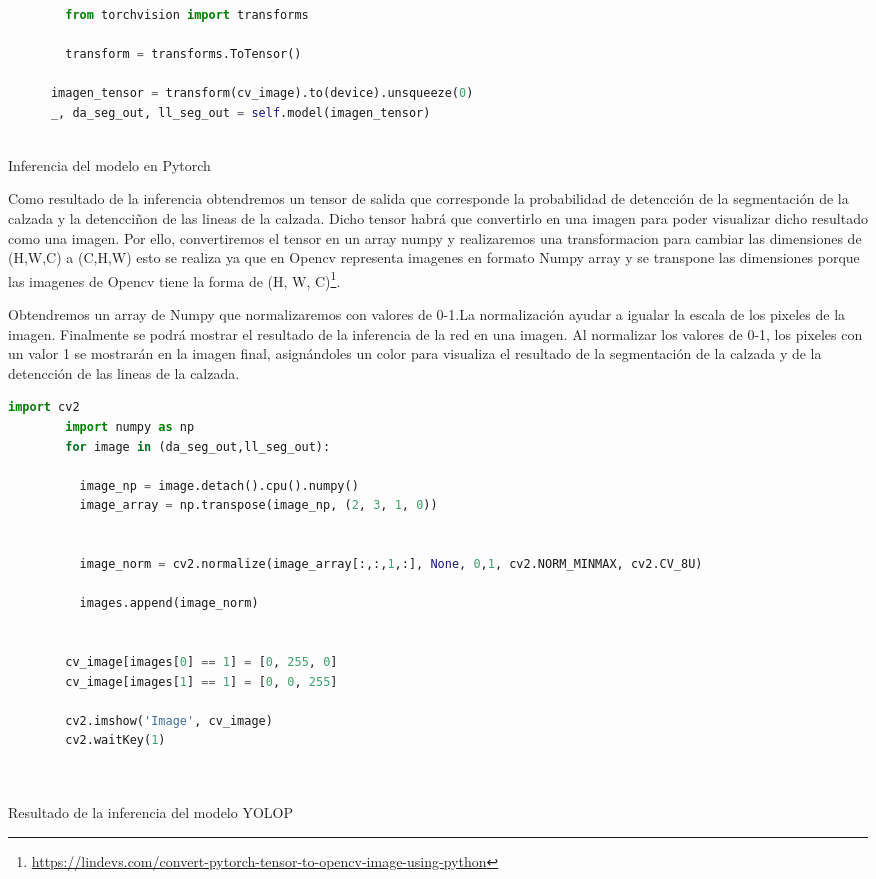     \begin{code}[h]
      \begin{lstlisting}[language=Python]
     
        from torchvision import transforms

        transform = transforms.ToTensor() 
                    
      imagen_tensor = transform(cv_image).to(device).unsqueeze(0)
      _, da_seg_out, ll_seg_out = self.model(imagen_tensor)
    
      \end{lstlisting}
      \caption[Inferencia del modelo]{Inferencia del modelo en Pytorch}
      \label{cod:codejemplo}
      \end{code}  

    \newpage
    Como resultado de la inferencia obtendremos un tensor de salida que corresponde la probabilidad de detencción de la segmentación
    de la calzada y la detencciñon de las lineas de la calzada. Dicho tensor habrá que convertirlo en una imagen para poder visualizar
    dicho resultado como una imagen. 
    Por ello, convertiremos el tensor en un array numpy y realizaremos una transformacion para cambiar las dimensiones de (H,W,C) 
    a (C,H,W) esto se realiza ya que en Opencv representa imagenes en formato Numpy array y se transpone las dimensiones porque las
    imagenes de Opencv tiene la forma de (H, W, C)\footnote{\url{https://lindevs.com/convert-pytorch-tensor-to-opencv-image-using-python}}. 
    \newline

    Obtendremos un array de Numpy que normalizaremos con valores de 0-1.La normalización 
    ayudar a igualar la escala de los pixeles de la imagen. Finalmente se podrá mostrar el resultado de la inferencia de la red 
    en una imagen. Al normalizar los valores de 0-1, los pixeles con un valor 1 se mostrarán en la imagen final, asignándoles un color
    para visualiza el resultado de la segmentación de la calzada y de la detencción de las lineas de la calzada. \newline
    \newpage
    \begin{code}[h]
      \begin{lstlisting}[language=Python]
        import cv2
        import numpy as np
        for image in (da_seg_out,ll_seg_out):

          image_np = image.detach().cpu().numpy()
          image_array = np.transpose(image_np, (2, 3, 1, 0))

        
          image_norm = cv2.normalize(image_array[:,:,1,:], None, 0,1, cv2.NORM_MINMAX, cv2.CV_8U)

          images.append(image_norm)

    
        cv_image[images[0] == 1] = [0, 255, 0]
        cv_image[images[1] == 1] = [0, 0, 255]

        cv2.imshow('Image', cv_image)
        cv2.waitKey(1)

    
      \end{lstlisting}
      \caption[Resultado de la inferencia del modelo YOLOP]{Resultado de la inferencia del modelo YOLOP}
      \label{cod:codejemplo}
      \end{code}  

